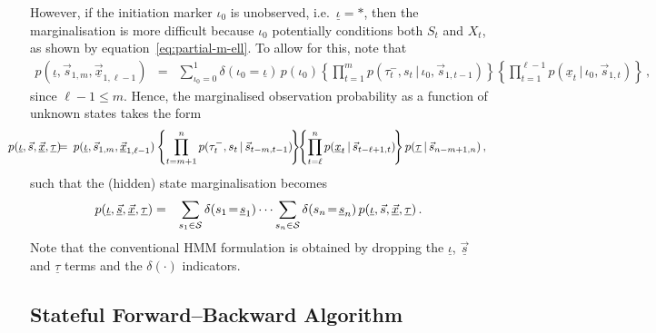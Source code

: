 \documentclass[a4paper]{article}
\newcommand{\ui}{\underline{\iota}}
\newcommand{\ut}{\underline{\tau}}
\newcommand{\tm}{\tau^{-}}
\newcommand{\vs}{\vec{s}}
\newcommand{\uvs}{\underline{\vs}}
\newcommand{\vx}{\vec{x}}
\newcommand{\uvx}{\underline{\vx}}
\newcommand{\ux}{\underline{x}}
\newcommand{\us}{\underline{s}}
\begin{document}
However, if the initiation marker $\iota_0$ is unobserved, i.e.\ $\ui=*$, then the marginalisation is more difficult
because $\iota_0$ potentially conditions both $S_t$ and $X_t$, as shown by equation~\eqref{eq:partial-m-ell}. 
To allow for this, note that
\begin{eqnarray}
p(\ui,\vs_{1,m},\uvx_{1,\ell-1}) & = & 
\sum_{\iota_0=0}^{1}\delta(\iota_0\!=\!\ui)\,
p(\iota_0)\left\{\prod_{t=1}^{m}p(\tm_t,s_t\,|\,\iota_0,\vs_{1,t-1})\right\}
\left\{\prod_{t=1}^{\ell-1}p(\ux_t\,|\,\iota_0,\vs_{1,t})\right\}
\,,
\label{eq:p_i_s_m_x_lm1}
\end{eqnarray}
since $\ell-1\le m$. Hence, the marginalised observation probability as a function of unknown states takes the form
\begin{eqnarray}
\hspace*{-7mm}
p(\ui,\vs,\uvx,\ut) & \!\!\!=\!\!\! &
p(\ui,\vs_{1,m},\uvx_{1,\ell-1})
\left\{\prod_{t=m+1}^{n}p(\tm_t,s_t\,|\,\vs_{t-m,t-1})\!\right\}
\!\!
\left\{\prod_{t=\ell}^{n}p(\ux_t\,|\,\vs_{t-\ell+1,t})\!\right\}
\,\!p(\ut\,|\,\vs_{n-m+1,n})\,,
\end{eqnarray}
such that the (hidden) state marginalisation becomes
\begin{eqnarray}
p(\ui,\uvs,\uvx,\ut) & = & 
\sum_{s_1\in{\cal S}} \delta(s_1\!=\!\us_1)
\cdots\sum_{s_n\in{\cal S}} \delta(s_n\!=\!\us_n)
\,p(\ui,\vs,\uvx,\ut)\,.
\label{eq:full-state}
\end{eqnarray}
Note that the conventional HMM formulation is obtained by dropping the $\ui$, $\uvs$ and $\ut$ terms and the $\delta(\cdot)$ indicators.

\subsection{Stateful Forward--Backward Algorithm}\label{sec:forward-backward:stateful}
\end{document}
